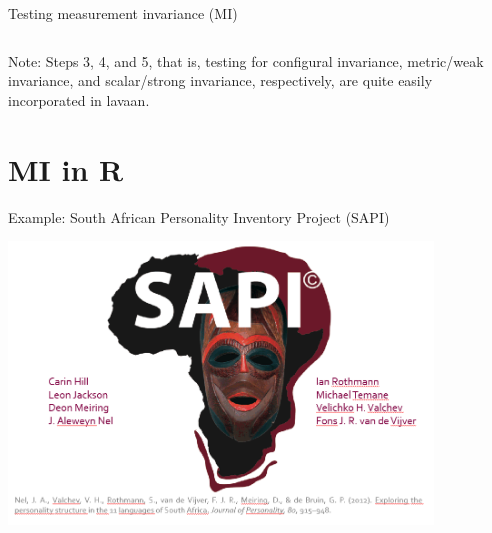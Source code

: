 \documentclass[10pt]{beamer}\usepackage[]{graphicx}\usepackage[]{xcolor}
\begin{document}
\begin{frame}{Testing measurement invariance (MI)}
\begin{columns}[T]
\begin{column}{.24\textwidth}
    \end{column}%
    \end{columns}

\vspace{5mm}

Note: Steps 3, 4, and 5, that is, testing for configural invariance, metric/weak invariance, and scalar/strong invariance, respectively, are quite easily incorporated in lavaan.

\end{frame}
%
\section{MI in R}
%
% 
% 
%
\begin{frame}{Example: South African Personality Inventory Project (SAPI)}
	
	\includegraphics[height=7.5cm,keepaspectratio=T] {SAPI.png}
	
\end{frame}
%
\end{document}
